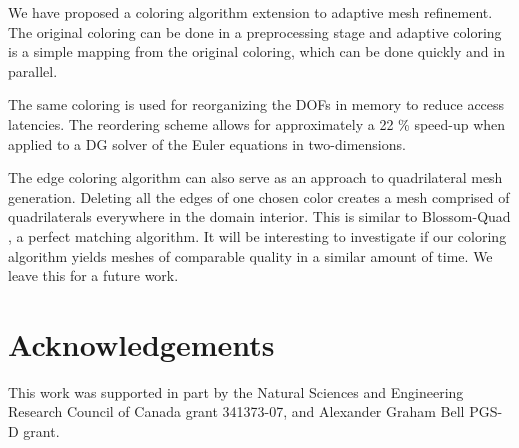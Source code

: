 \documentclass[12pt]{article}
\begin{document}
We have proposed a coloring algorithm extension to adaptive mesh refinement.  The original coloring can be done in a preprocessing stage and adaptive coloring is a simple mapping from the original coloring, which can be done quickly and in parallel.  

The same coloring is used for reorganizing the DOFs in memory to reduce access latencies.  The reordering scheme allows for approximately a 22 \% speed-up when applied to a DG solver of the Euler equations in two-dimensions.  

The edge coloring algorithm can also serve as an approach to quadrilateral mesh generation.  Deleting all the edges of one chosen color creates a mesh comprised of quadrilaterals everywhere in the domain interior.  This is similar to Blossom-Quad \cite{quadblossom}, a perfect matching algorithm.   It will be interesting to investigate if our coloring algorithm yields meshes of comparable quality in a similar amount of time.  We leave this for a future work.
	
	
\section{Acknowledgements}
This work was supported in part by the Natural Sciences and Engineering Research Council of Canada grant 341373-07, and Alexander Graham Bell PGS-D grant. 
	
	
	{}
	
\end{document}
